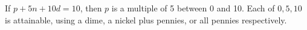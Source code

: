 If $ p+5n+10d=10 $, then $ p $ is a multiple of 5 between 0 and 10. Each of $\boxed{0,5,10}$ is attainable, using a dime, a nickel plus pennies, or all pennies respectively.
